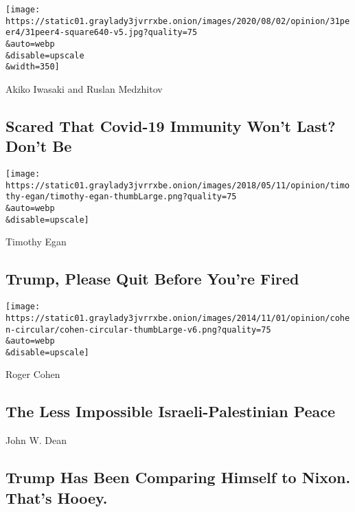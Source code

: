\texttt{[image: https://static01.graylady3jvrrxbe.onion/images/2020/08/02/opinion/31peer4/31peer4-square640-v5.jpg?quality=75\\\&auto=webp\\\&disable=upscale\\\&width=350]}

\href{/2020/07/31/opinion/coronavirus-antibodies-immunity.html}{}

Akiko Iwasaki and Ruslan Medzhitov

\hypertarget{scared-that-covid-19-immunity-wont-last-dont-be}{%
\subsection{Scared That Covid-19 Immunity Won't Last? Don't
Be}\label{scared-that-covid-19-immunity-wont-last-dont-be}}

\href{/2020/07/31/opinion/trump-resign.html}{}

\texttt{[image: https://static01.graylady3jvrrxbe.onion/images/2018/05/11/opinion/timothy-egan/timothy-egan-thumbLarge.png?quality=75\\\&auto=webp\\\&disable=upscale]}

Timothy Egan

\hypertarget{trump-please-quit-before-youre-fired}{%
\subsection{Trump, Please Quit Before You're
Fired}\label{trump-please-quit-before-youre-fired}}

\href{/2020/07/31/opinion/israeli-palestinian-peace.html}{}

\texttt{[image: https://static01.graylady3jvrrxbe.onion/images/2014/11/01/opinion/cohen-circular/cohen-circular-thumbLarge-v6.png?quality=75\\\&auto=webp\\\&disable=upscale]}

Roger Cohen

\hypertarget{the-less-impossible-israeli-palestinian-peace}{%
\subsection{The Less Impossible Israeli-Palestinian
Peace}\label{the-less-impossible-israeli-palestinian-peace}}

\href{/2020/07/31/opinion/trump-nixon-authoritarianism.html}{}

John W. Dean

\hypertarget{trump-has-been-comparing-himself-to-nixon-thats-hooey}{%
\subsection{Trump Has Been Comparing Himself to Nixon. That's
Hooey.}\label{trump-has-been-comparing-himself-to-nixon-thats-hooey}}


